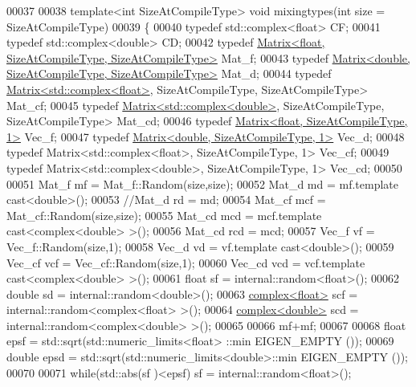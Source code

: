 \begin{DoxyCode}
00037 
00038 \textcolor{keyword}{template}<\textcolor{keywordtype}{int} SizeAtCompileType> \textcolor{keywordtype}{void} mixingtypes(\textcolor{keywordtype}{int} size = SizeAtCompileType)
00039 \{
00040   \textcolor{keyword}{typedef} std::complex<float>   CF;
00041   \textcolor{keyword}{typedef} std::complex<double>  CD;
00042   \textcolor{keyword}{typedef} \hyperlink{group___core___module_class_eigen_1_1_matrix}{Matrix<float, SizeAtCompileType, SizeAtCompileType>}
       Mat\_f;
00043   \textcolor{keyword}{typedef} \hyperlink{group___core___module_class_eigen_1_1_matrix}{Matrix<double, SizeAtCompileType, SizeAtCompileType>}
       Mat\_d;
00044   \textcolor{keyword}{typedef} \hyperlink{group___core___module_class_eigen_1_1_matrix}{Matrix<std::complex<float>}, SizeAtCompileType, SizeAtCompileType> 
      Mat\_cf;
00045   \textcolor{keyword}{typedef} \hyperlink{group___core___module_class_eigen_1_1_matrix}{Matrix<std::complex<double>}, SizeAtCompileType, SizeAtCompileType> 
      Mat\_cd;
00046   \textcolor{keyword}{typedef} \hyperlink{group___core___module_class_eigen_1_1_matrix}{Matrix<float, SizeAtCompileType, 1>} Vec\_f;
00047   \textcolor{keyword}{typedef} \hyperlink{group___core___module_class_eigen_1_1_matrix}{Matrix<double, SizeAtCompileType, 1>} Vec\_d;
00048   \textcolor{keyword}{typedef} Matrix<std::complex<float>, SizeAtCompileType, 1> Vec\_cf;
00049   \textcolor{keyword}{typedef} Matrix<std::complex<double>, SizeAtCompileType, 1> Vec\_cd;
00050 
00051   Mat\_f mf    = Mat\_f::Random(size,size);
00052   Mat\_d md    = mf.template cast<double>();
00053   \textcolor{comment}{//Mat\_d rd    = md;}
00054   Mat\_cf mcf  = Mat\_cf::Random(size,size);
00055   Mat\_cd mcd  = mcf.template cast<complex<double> >();
00056   Mat\_cd rcd = mcd;
00057   Vec\_f vf    = Vec\_f::Random(size,1);
00058   Vec\_d vd    = vf.template cast<double>();
00059   Vec\_cf vcf  = Vec\_cf::Random(size,1);
00060   Vec\_cd vcd  = vcf.template cast<complex<double> >();
00061   \textcolor{keywordtype}{float}           sf  = internal::random<float>();
00062   \textcolor{keywordtype}{double}          sd  = internal::random<double>();
00063   \hyperlink{structcomplex}{complex<float>}  scf = internal::random<complex<float> >();
00064   \hyperlink{structcomplex}{complex<double>} scd = internal::random<complex<double> >();
00065 
00066   mf+mf;
00067 
00068   \textcolor{keywordtype}{float}  epsf = std::sqrt(std::numeric\_limits<float> ::min EIGEN\_EMPTY ());
00069   \textcolor{keywordtype}{double} epsd = std::sqrt(std::numeric\_limits<double>::min EIGEN\_EMPTY ());
00070 
00071   \textcolor{keywordflow}{while}(std::abs(sf )<epsf) sf  = internal::random<float>();

\end{DoxyCode}
